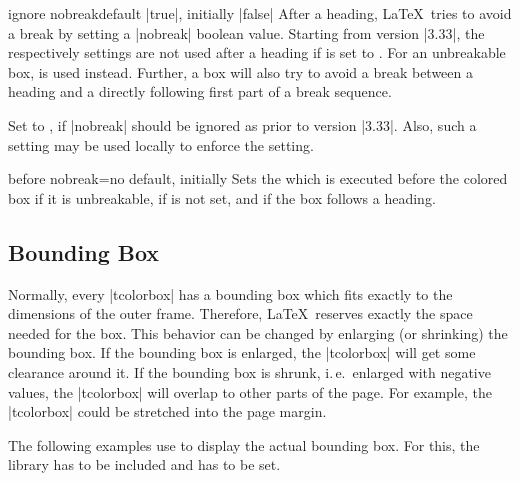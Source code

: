\begin{docTcbKey}[][doc new=2014-12-11]{ignore nobreak}{}{default |true|, initially |false|}
After a heading, \LaTeX\ tries to avoid a break by setting a |nobreak| boolean value.
Starting from version |3.33|, the  respectively 
settings are not used after a heading if  is
set to . For an unbreakable box,  is used instead.
Further, a  box will also try to
avoid a break between a heading and a directly following first part of a
break sequence.

Set  to , if |nobreak| should be
ignored as prior to version |3.33|. Also, such a setting may be used locally to
enforce the  setting.
\end{docTcbKey}

\begin{docTcbKey}[][doc new=2014-12-16]{before nobreak}{=}{no default, initially }
  Sets the  which is executed before the colored box if it
  is unbreakable, if  is not set, and if
  the box follows a heading.
\end{docTcbKey}


\clearpage
\subsection{Bounding Box}
Normally, every |tcolorbox| has a bounding box which fits exactly to the
dimensions of the outer frame. Therefore, \LaTeX\ reserves exactly the space
needed for the box.
This behavior can be changed by enlarging (or shrinking) the bounding box.
If the bounding box is enlarged, the |tcolorbox| will get some clearance
around it. If the bounding box is shrunk, i.\,e.\ enlarged with negative
values, the |tcolorbox| will overlap to other parts of the page.
For example, the |tcolorbox| could be stretched into the page margin.

\begin{marker}
The following examples use  to display the
actual bounding box. For this, the library  has to be included and
 has to be set.
\end{marker}

